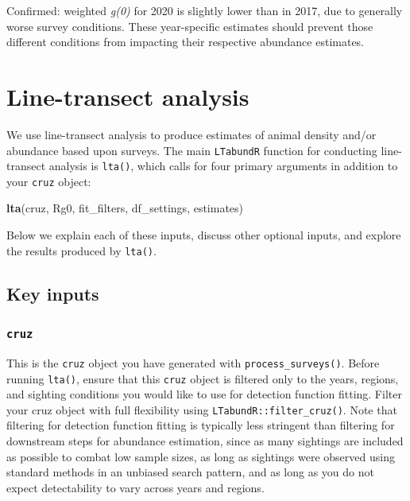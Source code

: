 \documentclass[
]{book}
\newenvironment{Shaded}{\begin{snugshade}}{\end{snugshade}}
\newcommand{\KeywordTok}[1]{\textcolor[rgb]{0.13,0.29,0.53}{\textbf{#1}}}
\newcommand{\NormalTok}[1]{#1}
\begin{document}
Confirmed: weighted \emph{g(0)} for 2020 is slightly lower than in 2017, due to generally worse survey conditions. These year-specific estimates should prevent those different conditions from impacting their respective abundance estimates.

\hypertarget{lta}{%
\chapter{Line-transect analysis}\label{lta}}

We use line-transect analysis to produce estimates of animal density and/or abundance based upon surveys. The main \texttt{LTabundR} function for conducting line-transect analysis is \texttt{lta()}, which calls for four primary arguments in addition to your \texttt{cruz} object:

\begin{Shaded}
\begin{Highlighting}[]
\KeywordTok{lta}\NormalTok{(cruz,}
\NormalTok{    Rg0,}
\NormalTok{    fit_filters,}
\NormalTok{    df_settings,}
\NormalTok{    estimates)}
\end{Highlighting}
\end{Shaded}

Below we explain each of these inputs, discuss other optional inputs, and explore the results produced by \texttt{lta()}.

\hypertarget{key-inputs}{%
\section*{Key inputs}\label{key-inputs}}

\hypertarget{cruz}{%
\subsection*{\texorpdfstring{\texttt{cruz}}{cruz}}\label{cruz}}

This is the \texttt{cruz} object you have generated with \texttt{process\_surveys()}. Before running \texttt{lta()}, ensure that this \texttt{cruz} object is filtered only to the years, regions, and sighting conditions you would like to use for detection function fitting. Filter your cruz object with full flexibility using \texttt{LTabundR::filter\_cruz()}. Note that filtering for detection function fitting is typically less stringent than filtering for downstream steps for abundance estimation, since as many sightings are included as possible to combat low sample sizes, as long as sightings were observed using standard methods in an unbiased search pattern, and as long as you do not expect detectability to vary across years and regions.
\end{document}
